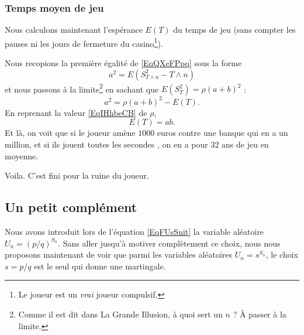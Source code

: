 \subsubsection{Temps moyen de jeu}

Nous calculons maintenant l'espérance \( E(T)\) du temps de jeu (sans compter les pauses ni les jours de fermeture du casino\footnote{Le joueur est un \emph{vrai} joueur compulsif.}).

Nous recopions la première égalité de \eqref{EqQXeFPpq} sous la forme
\begin{equation}
    a^2=E(S^2_{T\wedge n}-T\wedge n)
\end{equation}
et nous passons à la limite\footnote{Comme il est dit dans La Grande Illusion, à quoi sert un \( n\) ? À passer à la limite.} en sachant que \( E(S^2_T)=\rho(a+b)^2\) :
\begin{equation}
    a^2=\rho(a+b)^2-E(T).
\end{equation}
En reprenant la valeur \eqref{EqIHhbeCB} de \( \rho\), 
\begin{equation}
    E(T)=ab.
\end{equation}
Et là, on voit que si le joueur amène \( 1000\) euros contre une banque qui en a un million, et si ils jouent toutes les secondes , on en a pour \( 32\) ans de jeu en moyenne.

Voila. C'est fini pour la ruine du joueur.

\subsection{Un petit complément}

Nous avons introduit lors de l'équation \eqref{EqFUsSnit} la variable aléatoire \( U_n=(p/q)^{S_n}\). Sans aller jusqu'à motiver complètement ce choix, nous nous proposons maintenant de voir que parmi les variables aléatoires \( U_n=s^{S_n}\), le choix \( s=p/q\) est le seul qui donne une martingale.

